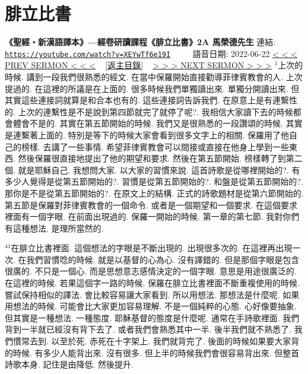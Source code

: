 \documentclass{book}
\begin{document}
\section{腓立比書}
\label{sec:XEYwTf6e19I}
\textbf{《聖經‧新漢語譯本》—經卷研讀課程《腓立比書》2A 馬榮德先生}
\newline
\newline
連結: \href{https://youtube.com/watch?v=XEYwTf6e19I}{\texttt{https://youtube.com/watch?v=XEYwTf6e19I}} ~~~~ 語音日期: 2022-06-22
\newline
\newline
\hyperref[sec:io2zo_oCeFk]{\small{< < < PREV SERMON < < <}}
~
\hyperref[sec:index]{\small{[返主目錄]}}
~
\hyperref[sec:fzMfZHATZ0U]{\small{> > > NEXT SERMON > > >}}
\newline
\newline
$^{1}$上次的時候.
講到一段我們很熟悉的經文.
在當中保羅開始直接勸導菲律賓教會的人.
上次提過的.
在這裡的所議是在上面的.
很多時候我們單獨讀出來.
單獨分開讀出來.
但其實這些連接詞就算是和合本也有的.
這些連接詞告訴我們.
在原意上是有連繫性的.
上次的連繫性是不是說到第四節就完了就停了呢?.
我相信大家讀下去的時候都會體會不是的.
其實在第五節開始的時候.
我們又是很熟悉的一段讚頌的時候.
其實是連繫著上面的.
特別是等下的時候大家會看到很多文字上的相關.
保羅用了他自己的榜樣.
去講了一些事情.
希望菲律賓教會可以間接或直接在他身上學到一些東西.
然後保羅很直接地提出了他的期望和要求.
然後在第五節開始.
榜樣轉了到第二個.
就是耶穌自己.
我想問大家.
以大家的習慣來說.
這首詩歌是從哪裡開始的?.
有多少人覺得是從第五節開始的?.
習慣是從第五節開始的?.
和盤是從第五節開始的?.
那你是不是從第五節開始的?.
在原文上的結構.
正式的詩歌題材是從第六節開始的.
第五節是保羅對菲律賓教會的一個命令.
或者是一個期望和一個要求.
在這個要求裡面有一個字眼.
在前面出現過的.
保羅一開始的時候.
第一章的第七節.
我對你們有這種想法.
是理所當然的.

$^{41}$在腓立比書裡面.
這個想法的字眼是不斷出現的.
出現很多次的.
在這裡再出現一次.
在我們習慣唸的時候.
就是以基督的心為心.
沒有譯錯的.
但是那個字眼是包含很廣的.
不只是一個心.
而是思想意志感情決定的一個字眼.
意思是用途很廣泛的.
在這裡的時候.
若果這個字一路的時候.
保羅在腓立比書裡面不斷重複使用的時候.
嘗試保持相似的譯法.
會比較容易讓大家看到.
所以用想法.
那想法是什麼呢.
如果用想法的時候.
可能會比大家更加容易理解.
不是一個純粹的心態.
心好像要抽象.
但其實是一種想法.
一種態度.
耶穌基督的態度是什麼呢.
通常在手詩歌裡面.
我們背到一半就已經沒有背下去了.
或者我們會熟悉其中一半.
後半我們就不熟悉了.
我們慣常去到.
以至於死.
赤死在十字架上.
我們就背完了.
後面的時候如果要大家背的時候.
有多少人能背出來.
沒有很多.
但上半的時候我們會很容易背出來.
但整首詩歌本身.
記住是由降低.
然後提升.
\end{document}
